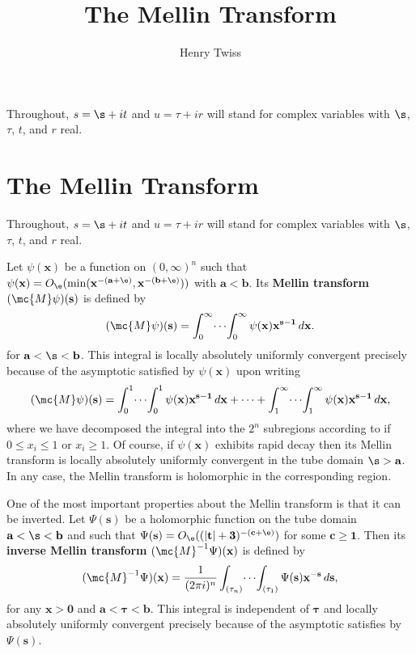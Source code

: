 \documentclass[12pt]{article}
\title{The Mellin Transform}
\author{Henry Twiss}
\begin{document}
  \date{}
  \maketitle
  Throughout, \(s = \s+it\) and \(u = \tau+ir\) will stand for complex variables with \(\s\), \(\tau\), \(t\), and \(r\) real.
  \section{The Mellin Transform}\label{sec:The_Mellin_transform}
    Throughout, \(s = \s+it\) and \(u = \tau+ir\) will stand for complex variables with \(\s\), \(\tau\), \(t\), and \(r\) real.

    Let \(\psi(\mathbf{x})\) be a function on \((0,\infty)^{n}\) such that \(\psi(\mathbf{x}) = O_{\e}(\min(\mathbf{x}^{-(\mathbf{a}+\e)},\mathbf{x}^{-(\mathbf{b}+\e)}))\) with \(\mathbf{a} < \mathbf{b}\). Its \textbf{Mellin transform} \((\mc{M}\psi)(\mathbf{s})\) is defined by
    \[
      (\mc{M}\psi)(\mathbf{s}) = \int_{0}^{\infty}\!\cdots\!\int_{0}^{\infty}\psi(\mathbf{x})\mathbf{x}^{\mathbf{s}-\mathbf{1}}\,d\mathbf{x}.
    \]
    for \(\mathbf{a} < \boldsymbol{\s} < \mathbf{b}\). This integral is locally absolutely uniformly convergent precisely because of the asymptotic satisfied by \(\psi(\mathbf{x})\) upon writing
    \[
      (\mc{M}\psi)(\mathbf{s}) = \int_{0}^{1}\!\cdots\!\int_{0}^{1}\psi(\mathbf{x})\mathbf{x}^{\mathbf{s}-\mathbf{1}}\,d\mathbf{x}+\cdots+\int_{1}^{\infty}\!\cdots\!\int_{1}^{\infty}\psi(\mathbf{x})\mathbf{x}^{\mathbf{s}-\mathbf{1}}\,d\mathbf{x},
    \]
    where we have decomposed the integral into the \(2^n\) subregions according to if \(0 \le x_{i} \le 1\) or \(x _{i} \ge 1\). Of course, if \(\psi(\mathbf{x})\) exhibits rapid decay then its Mellin transform is locally absolutely uniformly convergent in the tube domain \(\boldsymbol{\s} > \mathbf{a}\). In any case, the Mellin transform is holomorphic in the corresponding region.

    One of the most important properties about the Mellin transform is that it can be inverted. Let \(\Psi(\mathbf{s})\) be a holomorphic function on the tube domain \(\mathbf{a} < \boldsymbol{\s} < \mathbf{b}\) and such that \(\Psi(\mathbf{s}) = O_{\e}((|\mathbf{t}|+\mathbf{3})^{-(\mathbf{c}+\e)})\) for some \(\mathbf{c} \ge \mathbf{1}\). Then its \textbf{inverse Mellin transform} \((\mc{M}^{-1}\Psi)(\mathbf{x})\) is defined by
    \[
      (\mc{M}^{-1}\Psi)(\mathbf{x}) = \frac{1}{(2\pi i)^{n}}\int_{(\tau_{n})}\!\cdots\!\int_{(\tau_{1})}\Psi(\mathbf{s})\mathbf{x}^{-\mathbf{s}}\,d\mathbf{s},
    \]
    for any \(\mathbf{x} > \mathbf{0}\) and \(\mathbf{a} < \boldsymbol{\tau} < \mathbf{b}\). This integral is independent of \(\boldsymbol{\tau}\) and locally absolutely uniformly convergent precisely because of the asymptotic satisfies by \(\Psi(\mathbf{s})\).
\end{document}
